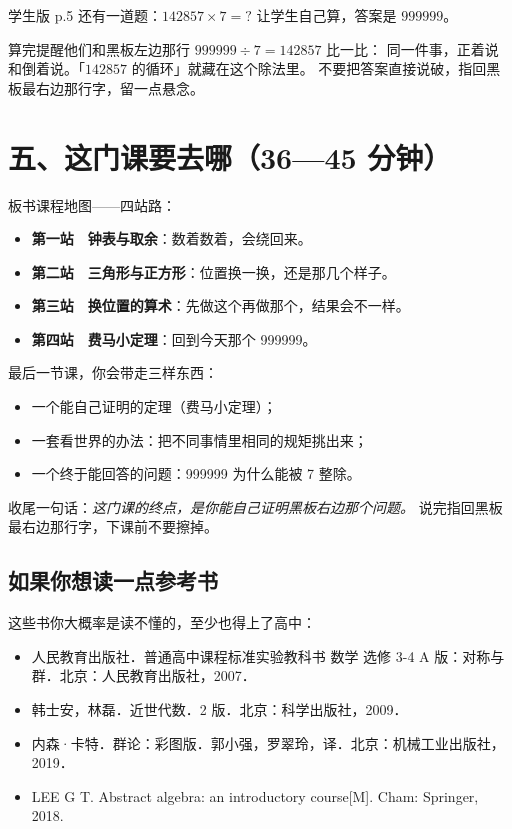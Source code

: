 \noindent 学生版 p.5 还有一道题：\(142857\times7=?\) 让学生自己算，答案是 \textbf{\(999999\)}。

\begin{caozuo}
  算完提醒他们和黑板左边那行 \(999999\div7=142857\) 比一比：
  同一件事，正着说和倒着说。「\(142857\) 的循环」就藏在这个除法里。
  不要把答案直接说破，指回黑板最右边那行字，留一点悬念。
\end{caozuo}

\section*{五、这门课要去哪（36—45 分钟）}

板书课程地图——四站路：

\begin{itemize}
  \item \textbf{第一站　钟表与取余}：数着数着，会绕回来。
  \item \textbf{第二站　三角形与正方形}：位置换一换，还是那几个样子。
  \item \textbf{第三站　换位置的算术}：先做这个再做那个，结果会不一样。
  \item \textbf{第四站　费马小定理}：回到今天那个 999999。
\end{itemize}

最后一节课，你会带走三样东西：

\begin{itemize}
  \item 一个能自己证明的定理（费马小定理）；
  \item 一套看世界的办法：把不同事情里相同的规矩挑出来；
  \item 一个终于能回答的问题：999999 为什么能被 7 整除。
\end{itemize}

\noindent 收尾一句话：\emph{这门课的终点，是你能自己证明黑板右边那个问题。}
说完指回黑板最右边那行字，下课前不要擦掉。

\subsection*{如果你想读一点参考书}

这些书你大概率是读不懂的，至少也得上了高中：

\begin{itemize}
  \item 人民教育出版社．普通高中课程标准实验教科书 数学 选修 3-4 A 版：对称与群．北京：人民教育出版社，2007．
  \item 韩士安，林磊．近世代数．2 版．北京：科学出版社，2009．
  \item 内森·卡特．群论：彩图版．郭小强，罗翠玲，译．北京：机械工业出版社，2019．
  \item LEE G T. Abstract algebra: an introductory course[M]. Cham: Springer, 2018.
\end{itemize}

